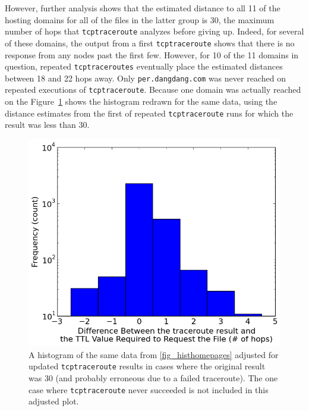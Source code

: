 However, further analysis shows that the estimated distance to all 11 of the hosting domains for all of the files in the latter group is 30, the maximum number of hops that \texttt{tcptraceroute} analyzes before giving up.
Indeed, for several of these domains, the output from a first \texttt{tcptraceroute} shows that there is no response from any nodes past the first few.
However, for 10 of the 11 domains in question, repeated \texttt{tcptraceroutes} eventually place the estimated distances between 18 and 22 hops away.
Only \texttt{per.dangdang.com} was never reached on repeated executions of \texttt{tcptraceroute}.
Because one domain was actually reached on the 
Figure~\ref{fig_histhomepages-mod} shows the histogram redrawn for the same data, using the distance estimates from the first of repeated \texttt{tcptraceroute} runs for which the result was less than 30.
\begin{figure}
	\includegraphics[width=\columnwidth]{figures/histhomepages-mod}
	\caption{
		A histogram of the same data from \ref{fig_histhomepages} adjusted for updated \texttt{tcptraceroute} results in cases where the original result was 30 (and probably erroneous due to a failed traceroute).
		The one case where \texttt{tcptraceroute} never succeeded is not included in this adjusted plot.
	}
	\label{fig_histhomepages-mod}
\end{figure}

